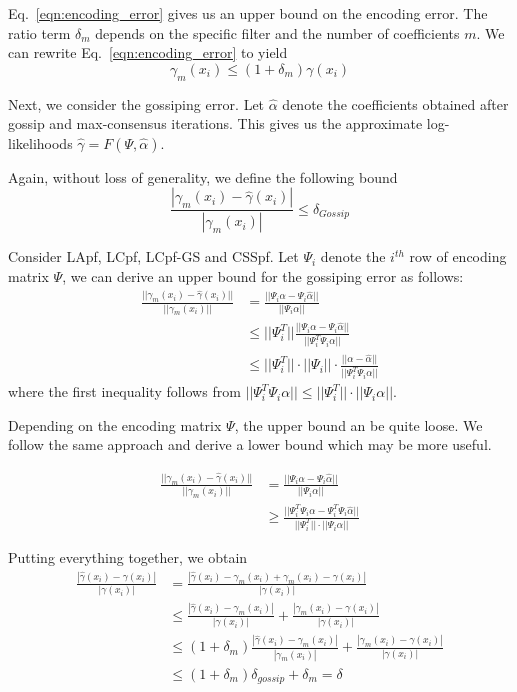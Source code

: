 \documentclass[10pt,letterpaper,final]{article}
\begin{document}
Eq.~\eqref{eqn:encoding_error} gives us an upper bound on the encoding error. The ratio term $\delta_m$ depends on the specific filter and the number of coefficients $m$. We can rewrite Eq.~\eqref{eqn:encoding_error} to yield
\begin{equation}
\gamma_m(x_i) \leq (1+\delta_m)\gamma(x_i)
\end{equation}

Next, we consider the gossiping error. Let $\hat{\alpha}$ denote the coefficients obtained after gossip and max-consensus iterations. This gives us the approximate log-likelihoods $\hat{\gamma} = F(\Psi, \hat{\alpha})$. 

Again, without loss of generality, we define the following bound
\begin{equation}
\frac{|\gamma_m(x_i)-\hat{\gamma}(x_i)|}{|\gamma_m(x_i)|} \leq \delta_{Gossip}
\label{eqn:gossiping_error}
\end{equation}

Consider LApf, LCpf, LCpf-GS and CSSpf. Let $\Psi_i$ denote the $i^{th}$ row of encoding matrix $\Psi$, we can derive an upper bound for the gossiping error as follows:
\begin{align}
\frac{||\gamma_m(x_i)-\hat{\gamma}(x_i)||}{||\gamma_m(x_i)||}&=\frac{||\Psi_i\alpha-\Psi_i\hat{\alpha}||}{||\Psi_i\alpha||} \\
&\leq ||\Psi_i^T||\frac{||\Psi_i\alpha-\Psi_i\hat{\alpha}||}{||\Psi_i^T\Psi_i\alpha||} \\
&\leq ||\Psi_i^T|| \cdot ||\Psi_i||\cdot \frac{||\alpha-\hat{\alpha}||}{||\Psi_i^T\Psi_i\alpha||} 
\end{align}
where the first inequality follows from $||\Psi_i^T\Psi_i \alpha|| \leq ||\Psi_i^T||\cdot ||\Psi_i\alpha||$.

Depending on the encoding matrix $\Psi$, the upper bound an be quite loose. We follow the same approach and derive a lower bound which may be more useful. 

\begin{align}
\frac{||\gamma_m(x_i)-\hat{\gamma}(x_i)||}{||\gamma_m(x_i)||}&=\frac{||\Psi_i\alpha-\Psi_i\hat{\alpha}||}{||\Psi_i\alpha||} \nonumber \\
&\geq \frac{||\Psi_i^T\Psi_i\alpha-\Psi_i^T\Psi_i\hat{\alpha}||}{||\Psi_i^T||\cdot ||\Psi_i\alpha||}
\end{align}

Putting everything together, we obtain
\begin{align}
\frac{|\hat{\gamma}(x_i) - \gamma(x_i)|}{|\gamma(x_i)|}&=\frac{|\hat{\gamma}(x_i) -\gamma_m(x_i) + \gamma_m(x_i) - \gamma(x_i)|}{|\gamma(x_i)|} \\
&\leq \frac{|\hat{\gamma}(x_i) -\gamma_m(x_i)|}{|\gamma(x_i)|}+\frac{|\gamma_m(x_i) - \gamma(x_i)|}{|\gamma(x_i)|} \\
&\leq (1+\delta_m)\frac{|\hat{\gamma}(x_i) -\gamma_m(x_i)|}{|\gamma_m(x_i)|}+\frac{|\gamma_m(x_i) - \gamma(x_i)|}{|\gamma(x_i)|} \\
&\leq (1+\delta_m)\delta_{gossip} + \delta_m  = \delta
\label{eqn:error_bound}
\end{align}
\end{document}
